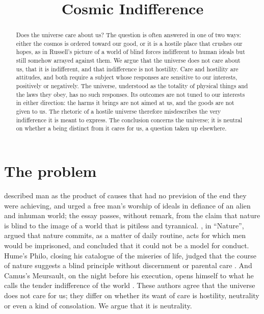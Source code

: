 \documentclass{situationist-preprint}
\title{Cosmic Indifference}
\begin{document}
\maketitle

\begin{abstract}
Does the universe care about us? The question is often answered in one of two ways: either the cosmos is ordered toward our good, or it is a hostile place that crushes our hopes, as in Russell's picture of a world of blind forces indifferent to human ideals but still somehow arrayed against them. We argue that the universe does not care about us, that it is indifferent, and that indifference is not hostility. Care and hostility are attitudes, and both require a subject whose responses are sensitive to our interests, positively or negatively. The universe, understood as the totality of physical things and the laws they obey, has no such responses. Its outcomes are not tuned to our interests in either direction: the harms it brings are not aimed at us, and the goods are not given to us. The rhetoric of a hostile universe therefore misdescribes the very indifference it is meant to express. The conclusion concerns the universe; it is neutral on whether a being distinct from it cares for us, a question taken up elsewhere.
\end{abstract}

\section{The problem}

\citet{Russell1903} described man as the product of causes that had no prevision of the end they were achieving, and urged a free man's worship of ideals in defiance of an alien and inhuman world; the essay passes, without remark, from the claim that nature is blind to the image of a world that is pitiless and tyrannical. \citet{Mill1874}, in \enquote{Nature}, argued that nature commits, as a matter of daily routine, acts for which men would be imprisoned, and concluded that it could not be a model for conduct. Hume's Philo, closing his catalogue of the miseries of life, judged that the course of nature suggests a blind principle without discernment or parental care \citep[XI]{Hume1779}. And Camus's Meursault, on the night before his execution, opens himself to what he calls the tender indifference of the world \citep{Camus1942}. These authors agree that the universe does not care for us; they differ on whether its want of care is hostility, neutrality or even a kind of consolation. We argue that it is neutrality.
\end{document}
